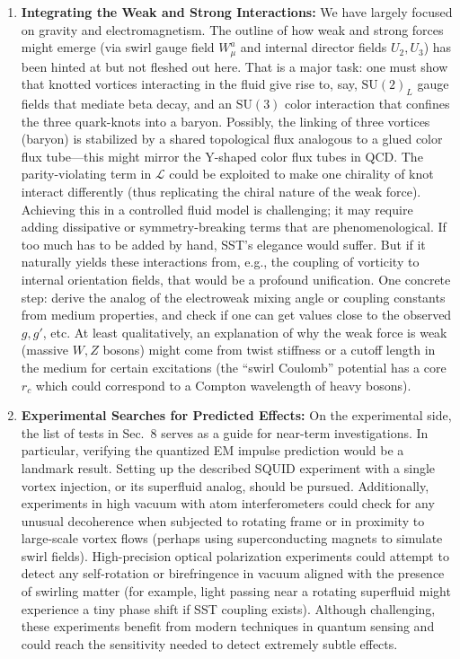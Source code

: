 \documentclass[10pt,reprint,aps,onecolumn,nofootinbib]{revtex4-2}
\newcommand{\rc}{r_c}                                    %
\providecommand{\rc}{r_c}
\begin{document}
\begin{enumerate}
    \item \textbf{Integrating the Weak and Strong Interactions:} We have largely focused on gravity and electromagnetism. The outline of how weak and strong forces might emerge (via swirl gauge field $W_\mu^a$ and internal director fields $U_2, U_3$) has been hinted at but not fleshed out here. That is a major task: one must show that knotted vortices interacting in the fluid give rise to, say, $\mathrm{SU}(2)_L$ gauge fields that mediate beta decay, and an $\mathrm{SU}(3)$ color interaction that confines the three quark-knots into a baryon. Possibly, the linking of three vortices (baryon) is stabilized by a shared topological flux analogous to a glued color flux tube---this might mirror the Y-shaped color flux tubes in QCD. The parity-violating term in $\mathcal{L}$ could be exploited to make one chirality of knot interact differently (thus replicating the chiral nature of the weak force). Achieving this in a controlled fluid model is challenging; it may require adding dissipative or symmetry-breaking terms that are phenomenological. If too much has to be added by hand, SST’s elegance would suffer. But if it naturally yields these interactions from, e.g., the coupling of vorticity to internal orientation fields, that would be a profound unification. One concrete step: derive the analog of the electroweak mixing angle or coupling constants from medium properties, and check if one can get values close to the observed $g, g'$, etc. At least qualitatively, an explanation of why the weak force is weak (massive $W,Z$ bosons) might come from twist stiffness or a cutoff length in the medium for certain excitations (the ``swirl Coulomb'' potential has a core $\rc$ which could correspond to a Compton wavelength of heavy bosons).
\item \textbf{Experimental Searches for Predicted Effects:} On the experimental side, the list of tests in Sec.~8 serves as a guide for near-term investigations. In particular, verifying the quantized EM impulse prediction would be a landmark result. Setting up the described SQUID experiment with a single vortex injection, or its superfluid analog, should be pursued. Additionally, experiments in high vacuum with atom interferometers could check for any unusual decoherence when subjected to rotating frame or in proximity to large-scale vortex flows (perhaps using superconducting magnets to simulate swirl fields). High-precision optical polarization experiments could attempt to detect any self-rotation or birefringence in vacuum aligned with the presence of swirling matter (for example, light passing near a rotating superfluid might experience a tiny phase shift if SST coupling exists). Although challenging, these experiments benefit from modern techniques in quantum sensing and could reach the sensitivity needed to detect extremely subtle effects.

\end{enumerate}
\end{document}
